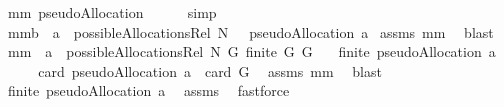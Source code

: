 \begin{isabellebody}
\isanewline
{}\isamarkupfalse%
\ mm{}{}{\isacharcolon}\ {\isachardoublequoteopen}pseudoAllocation\ {\isacharbraceleft}{\isacharbraceright}\ {\isacharequal}\ {\isacharbraceleft}{\isacharbraceright}{\isachardoublequoteclose}%
\isadelimproof
\ %
\endisadelimproof
%
\isatagproof
{}\isamarkupfalse%
\ simp%
\endisatagproof
{\isafoldproof}%
%
\isadelimproof
%
\endisadelimproof
\isanewline
\isanewline
{}\isamarkupfalse%
\ mm{}{}b{\isacharcolon}\ \ {\isachardoublequoteopen}a\ {\isasymin}\ possibleAllocationsRel\ N\ {\isacharbraceleft}{\isacharbraceright}{\isachardoublequoteclose}\ \ {\isachardoublequoteopen}{\isacharparenleft}pseudoAllocation\ a{\isacharparenright}{\isacharequal}{\isacharbraceleft}{\isacharbraceright}{\isachardoublequoteclose}\isanewline
%
\isadelimproof
%
\endisadelimproof
%
\isatagproof
{}\isamarkupfalse%
\ assms\ mm{}{}\ \isamarkupfalse%
\ blast%
\endisatagproof
{\isafoldproof}%
%
\isadelimproof
\isanewline
%
\endisadelimproof
\isanewline
{}\isamarkupfalse%
\ mm{}{}{\isacharcolon}\ \ {\isachardoublequoteopen}a\ {\isasymin}\ possibleAllocationsRel\ N\ G{\isachardoublequoteclose}\ {\isachardoublequoteopen}finite\ G{\isachardoublequoteclose}\ {\isachardoublequoteopen}G\ {\isasymnoteq}\ {\isacharbraceleft}{\isacharbraceright}{\isachardoublequoteclose}\isanewline
{}\ {\isachardoublequoteopen}finite\ {\isacharparenleft}pseudoAllocation\ a{\isacharparenright}{\isachardoublequoteclose}\ \isanewline
%
\isadelimproof
%
\endisadelimproof
%
\isatagproof
{}\isamarkupfalse%
\ {\isacharminus}\isanewline
\ \ \isamarkupfalse%
\ {\isachardoublequoteopen}card\ {\isacharparenleft}pseudoAllocation\ a{\isacharparenright}\ {\isacharequal}\ card\ G{\isachardoublequoteclose}\ \isamarkupfalse%
\ assms{\isacharparenleft}{}{\isacharcomma}{}{\isacharparenright}\ mm{}{}\ \isamarkupfalse%
\ blast\isanewline
\ \ \isamarkupfalse%
\ {\isachardoublequoteopen}finite\ {\isacharparenleft}pseudoAllocation\ a{\isacharparenright}{\isachardoublequoteclose}\ \isamarkupfalse%
\ assms{\isacharparenleft}{}{\isacharcomma}{}{\isacharparenright}\ \isamarkupfalse%
\ fastforce\isanewline
{}\isamarkupfalse%
%
\endisatagproof
{\isafoldproof}%

\end{isabellebody}
